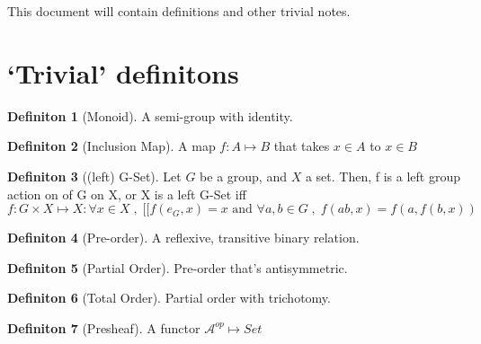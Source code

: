 \documentclass{article}
\theoremstyle{definition}
\theoremstyle{definition}
\newtheorem{definition}{Definiton}[section]
\begin{document}
This document will contain definitions and other trivial notes.
\section{`Trivial' definitons}

\begin{definition}[Monoid] %
	A semi-group with identity.
\end{definition}

\begin{definition}[Inclusion Map] %
	A map $ f:A \mapsto B $ that takes $ x\in A $ to $ x \in B $
\end{definition}

\begin{definition}[(left) G-Set] %
Let $ G $ be a group, and $ X $ a set. Then, f is a left group action on of G on X, or X is a left G-Set iff
\[ f:G \times X \mapsto X : \forall x \in X \; , \;  [ [ f(e_G,x)=x \text{ and } \forall a,b \in G \; , \; f(ab,x)=f(a, f(b,x))  \]
\end{definition}

\begin{definition}[Pre-order] %
	A reflexive, transitive binary relation.
\end{definition}

\begin{definition}[Partial Order] %
Pre-order that's antisymmetric.
\end{definition}

\begin{definition}[Total Order] %
Partial order with trichotomy.
\end{definition}


\begin{definition}[Presheaf] %
	A functor $ \mathcal{A} ^{op} \mapsto Set$
\end{definition}
\end{document}
